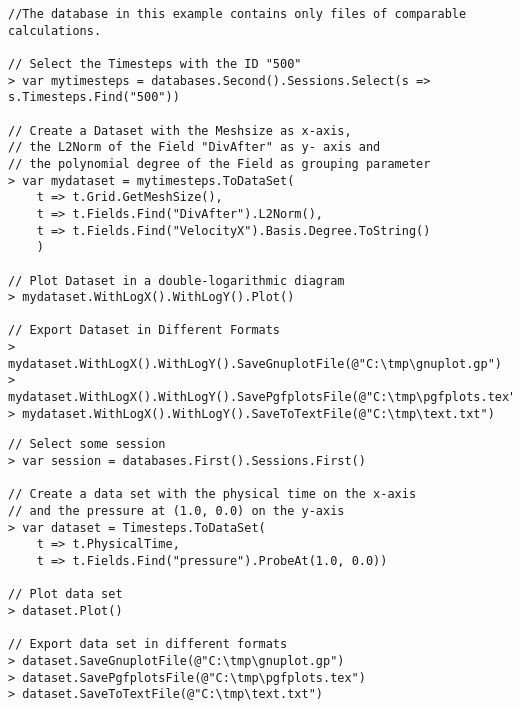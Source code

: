 \begin{lstlisting}[title=Advanced example: Exporting a Dataset]
//The database in this example contains only files of comparable calculations.

// Select the Timesteps with the ID "500"
> var mytimesteps = databases.Second().Sessions.Select(s => s.Timesteps.Find("500"))

// Create a Dataset with the Meshsize as x-axis,
// the L2Norm of the Field "DivAfter" as y- axis and
// the polynomial degree of the Field as grouping parameter
> var mydataset = mytimesteps.ToDataSet(
	t => t.Grid.GetMeshSize(),
	t => t.Fields.Find("DivAfter").L2Norm(),
	t => t.Fields.Find("VelocityX").Basis.Degree.ToString()
	)
	
// Plot Dataset in a double-logarithmic diagram
> mydataset.WithLogX().WithLogY().Plot()

// Export Dataset in Different Formats
> mydataset.WithLogX().WithLogY().SaveGnuplotFile(@"C:\tmp\gnuplot.gp")
> mydataset.WithLogX().WithLogY().SavePgfplotsFile(@"C:\tmp\pgfplots.tex")
> mydataset.WithLogX().WithLogY().SaveToTextFile(@"C:\tmp\text.txt")
\end{lstlisting}

\begin{lstlisting}[title=Advanced example: Time history in a specific point]
// Select some session
> var session = databases.First().Sessions.First()

// Create a data set with the physical time on the x-axis
// and the pressure at (1.0, 0.0) on the y-axis
> var dataset = Timesteps.ToDataSet(
	t => t.PhysicalTime,
	t => t.Fields.Find("pressure").ProbeAt(1.0, 0.0))

// Plot data set
> dataset.Plot()

// Export data set in different formats
> dataset.SaveGnuplotFile(@"C:\tmp\gnuplot.gp")
> dataset.SavePgfplotsFile(@"C:\tmp\pgfplots.tex")
> dataset.SaveToTextFile(@"C:\tmp\text.txt")
\end{lstlisting}